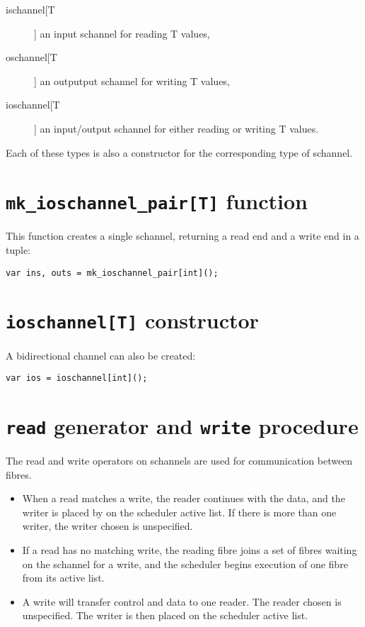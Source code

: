 \documentclass[oneside]{book}
\begin{document}
{\begin{description}
\item[ischannel[T]] an input schannel for reading T values,
\item[oschannel[T]] an outputput schannel for writing T values,
\item[ioschannel[T]] an input/output schannel for either reading or writing T values.
\end{description}

Each of these types is also a constructor for the corresponding
type of schannel.

\section{{\tt mk\_ioschannel\_pair[T]} function}
This function creates a single schannel, returning a read end
and a write end in a tuple:

\begin{verbatim}
var ins, outs = mk_ioschannel_pair[int]();
\end{verbatim}

\section{{\tt ioschannel[T]} constructor}
A bidirectional channel can also be created:

\begin{verbatim}
var ios = ioschannel[int]();
\end{verbatim}


\section{{\tt read} generator and {\tt write} procedure}
The read and write operators on schannels are used for 
communication between fibres. 

\begin{itemize}
\item
When a read matches a write,
the reader continues with the data, and the writer is
placed by on the scheduler active list. If there is
more than one writer, the writer chosen is unspecified.

\item If a read has no matching write, the reading fibre joins
a set of fibres waiting on the schannel for a write,
and the scheduler begins execution of one fibre from
its active list.

\item A write will transfer control and data to one reader.
The reader chosen is unspecified. The writer is then
placed on the scheduler active list.


\end{itemize}}
\end{document}
